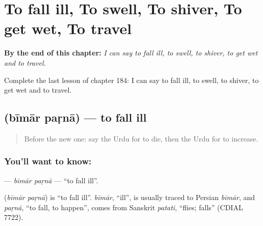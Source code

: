 
\chapter{To fall ill, To swell, To shiver, To get wet, To travel}
\label{ch:ur-to-fall-ill-to-swell-to-shiver-to-get-wet-to-travel}

\begin{chapteropening}
\textbf{By the end of this chapter:} \emph{I can say to fall ill, to swell, to shiver, to get wet and to travel.}

Complete the last lesson of chapter 184: I can say to fall ill, to swell, to shiver, to get wet and to travel.
\end{chapteropening}

\section[\texorpdfstring{\ur{بیمار} \ur{پڑنا} (bīmār paṛnā)}{بیمار پڑنا (bīmār paṛnā)}]{  (bīmār paṛnā) — to fall ill}

\label{lesson:UR-C184-bimar-parna}



\begin{quote}
Before the new one: say the Urdu for to die, then the Urdu for to increase.
\end{quote}

\subsection*{You'll want to know:  }
\textbf{ } — \emph{bīmār paṛnā} — \textquotedblleft{}to fall ill\textquotedblright{}.

\begin{cousinweb}
\textbf{ } (\emph{bīmār paṛnā}) is \textquotedblleft{}to fall ill\textquotedblright{}. \emph{bīmār}, \textquotedblleft{}ill\textquotedblright{}, is usually traced to Persian \emph{bīmār}, and \emph{paṛnā}, \textquotedblleft{}to fall, to happen\textquotedblright{}, comes from Sanskrit \emph{patati}, \textquotedblleft{}flies; falls\textquotedblright{} (CDIAL 7722).
\end{cousinweb}

